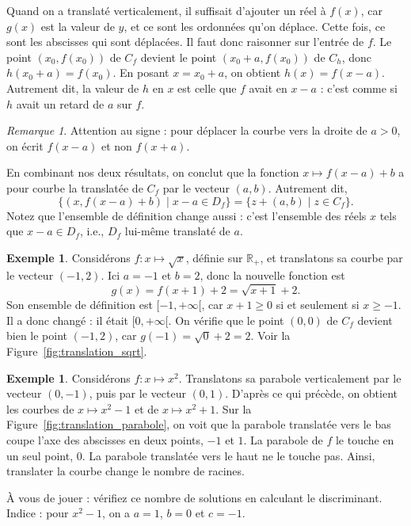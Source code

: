 \documentclass[12pt,a4paper]{article}
\theoremstyle{plain}
\theoremstyle{definition}
\newtheorem{example}[theorem]{Exemple}
\theoremstyle{remark}
\newtheorem*{remark}{Remarque}
\begin{document}
Quand on a translaté verticalement, il suffisait d'ajouter un réel à $f(x)$, car
$g(x)$ est la valeur de $y$, et ce sont les ordonnées qu'on déplace. Cette fois, ce
sont les abscisses qui sont déplacées. Il faut donc raisonner sur l'entrée de $f$.
Le point $(x_0, f(x_0))$ de $C_f$ devient le point $(x_0 + a, f(x_0))$ de $C_h$,
donc $h(x_0 + a) = f(x_0)$. En posant $x = x_0 + a$, on obtient $h(x) = f(x - a)$.
Autrement dit, la valeur de $h$ en $x$ est celle que $f$ avait en $x - a$ : c'est
comme si $h$ avait un retard de $a$ sur $f$.

\begin{remark}
  Attention au signe : pour déplacer la courbe vers la droite de $a > 0$, on écrit
  $f(x - a)$ et non $f(x + a)$.
\end{remark}

En combinant nos deux résultats, on conclut que la fonction $x \mapsto f(x - a) + b$
a pour courbe la translatée de $C_f$ par le vecteur $(a, b)$. Autrement dit,
\[
\{(x, f(x - a) + b) \mid x - a \in D_f\} = \{z + (a, b) \mid z \in C_f\}.
\]
Notez que l'ensemble de définition change aussi : c'est l'ensemble des réels $x$ tels
que $x - a \in D_f$, i.e., $D_f$ lui-même translaté de $a$.

\begin{example}
  Considérons $f : x \mapsto \sqrt{x}$, définie sur $\mathbb{R}_+$, et translatons sa
  courbe par le vecteur $(-1, 2)$. Ici $a = -1$ et $b = 2$, donc la nouvelle fonction est
  \[
  g(x) = f(x + 1) + 2 = \sqrt{x + 1} + 2.
  \]
  Son ensemble de définition est $[-1, +\infty[$, car $x + 1 \ge 0$ si et seulement
  si $x \ge -1$. Il a donc changé : il était $[0, +\infty[$. On vérifie que le point
  $(0, 0)$ de $C_f$ devient bien le point $(-1, 2)$, car $g(-1) = \sqrt{0} + 2 = 2$.
  Voir la Figure~\ref{fig:translation_sqrt}.
\end{example}

\begin{example}
  Considérons $f : x \mapsto x^2$. Translatons sa parabole verticalement par le
  vecteur $(0, -1)$, puis par le vecteur $(0, 1)$. D'après ce qui précède, on obtient les
  courbes de $x \mapsto x^2 - 1$ et de $x \mapsto x^2 + 1$. Sur la
  Figure~\ref{fig:translation_parabole}, on voit que la parabole translatée vers le bas
  coupe l'axe des abscisses en deux points, $-1$ et $1$. La parabole de $f$ le touche
  en un seul point, $0$. La parabole translatée vers le haut ne le touche pas. Ainsi,
  translater la courbe change le nombre de racines.
  
  À vous de jouer : vérifiez ce nombre de solutions en calculant le discriminant.
  Indice : pour $x^2 - 1$, on a $a = 1$, $b = 0$ et $c = -1$.
\end{example}
\end{document}
